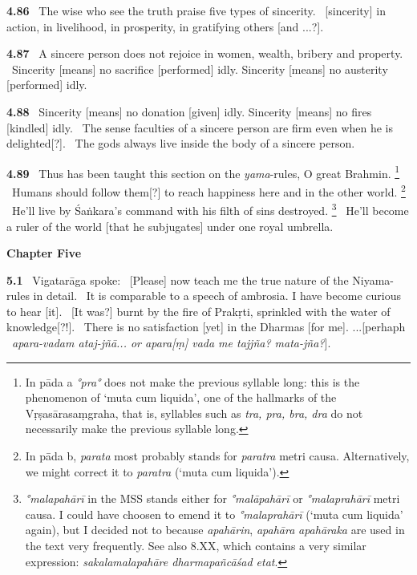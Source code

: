 \documentclass{article}
\newcommand{\skt}[1]{\textit{#1}}
\begin{document}
\textbf{4.86}%
\ The wise who see the truth praise five types of sincerity.%
\ [sincerity] in action, in livelihood, in prosperity, in gratifying others [and ...?].%


\textbf{4.87}%
\ A sincere person does not rejoice in women, wealth, bribery and property.%
\ Sincerity [means] no sacrifice [performed] idly. Sincerity [means] no austerity [performed] idly.%


\textbf{4.88}%
\ Sincerity [means] no donation [given] idly. Sincerity [means] no fires [kindled] idly.%
\ The sense faculties of a sincere person are firm even when he is delighted[?].%
\ The gods always live inside the body of a sincere person.%


\textbf{4.89}%
\ Thus has been taught this section on the \skt{yama}-rules, O great Brahmin.%
\footnote{In pāda a \skt{°pra°} does not make the previous syllable long: this is the phenomenon of                `muta cum liquida', one of the hallmarks of the Vṛṣasārasaṃgraha,                 that is, syllables such as \skt{tra, pra, bra, dra} do not necessarily make the                 previous syllable long. }%
\ Humans should follow them[?] to reach happiness here and in the other world.%
\footnote{In pāda b, \skt{parata} most probably stands for \skt{paratra} metri causa. Alternatively,                we might correct it to \skt{paratra} (`muta cum liquida'). }%
\ He'll live by Śaṅkara's command with his filth of sins destroyed.%
\footnote{\skt{°malapahārī} in the MSS stands either for \skt{°malāpahārī} or \skt{°malaprahārī} metri causa.                 I could have choosen to emend it to \skt{°malaprahārī} (`muta cum liquida' again),                but I decided not to because \skt{apahārin}, \skt{apahāra}                \skt{apahāraka} are used in the text very frequently. See also 8.XX, which contains a very similar expression:                        \skt{sakalamalapahāre dharmapañcāśad etat}. }%
\ He'll become a ruler of the world [that he subjugates] under one royal umbrella.%
\vfill\pagebreak\begin{center}{\large\textbf{ Chapter Five 
}}\end{center}


\textbf{5.1}%
\ Vigatarāga spoke:%
\ [Please] now teach me the true nature of the Niyama-rules in detail.%
\ It is comparable to a speech of ambrosia. I have become curious to hear [it].%
\ [It was?] burnt by the fire of Prakṛti, sprinkled with the water of knowledge[?!].%
\ There is no satisfaction [yet] in the Dharmas [for me]. ...[perhaph%
\                         \skt{apara-vadam ataj-jñā... or apara[ṃ] vada me tajjña? mata-jña?}].%
\end{document}
